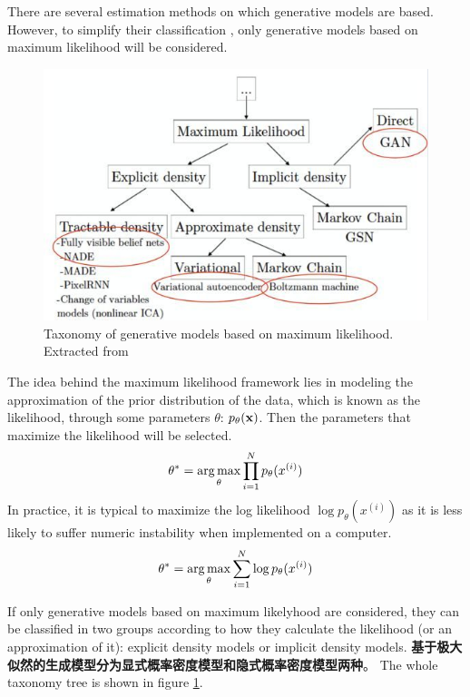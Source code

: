 There are several estimation methods on which generative models are based. However, to 
simplify their classification \cite{Goodfellow2016}, only generative models based on 
maximum likelihood will be considered.

\begin{figure}[H]
\centering
\includegraphics[scale=0.618]{pix/dgm/taxonomy_goodfellow.jpeg}
\caption{Taxonomy of generative models based on maximum likelihood. Extracted from \cite{Goodfellow2016}}
\label{fig:taxonomy_generative_models}
\end{figure}

The idea behind the maximum likelihood framework lies in modeling the approximation of 
the prior distribution of the data, which is known as the likelihood, through some 
parameters $\theta$: $p_\theta(\mathbf{x})$. Then the parameters that maximize the likelihood 
will be selected.
\begin{align}
\theta^* = \operatorname*{arg\,max}_\theta \prod_{i=1}^N p_\theta(x^{(i)})
\end{align}
In practice, it is typical to maximize the log likelihood $\log p_\theta(x^{(i)})$ as 
it is less likely to suffer numeric instability when implemented on a computer.
\begin{align}
\theta^* = \operatorname*{arg\,max}_\theta \sum_{i=1}^N \log p_\theta(x^{(i)})
\end{align}

If only generative models based on maximum likelyhood are considered, they can be 
classified in two groups according to how they calculate the likelihood (or an 
approximation of it): explicit density models or implicit density models. 
{\bf 基于极大似然的生成模型分为显式概率密度模型和隐式概率密度模型两种}。
The whole taxonomy tree is shown in figure \ref{fig:taxonomy_generative_models}.

